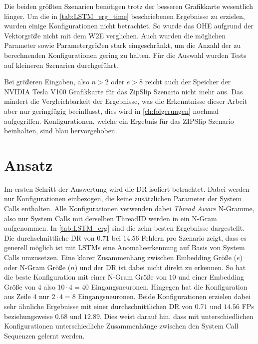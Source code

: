     Die beiden größten Szenarien benötigen trotz der besseren Grafikkarte wesentlich länger.
    Um die in \autoref{tab:LSTM_erg_time} beschriebenen Ergebnisse zu erzielen, wurden einige Konfigurationen nicht betrachtet.
    So wurde das \ac{OHE} aufgrund der Vektorgröße nicht mit dem W2E verglichen.
    Auch wurden die möglichen Parameter sowie Parametergrößen stark eingeschränkt, um die Anzahl der zu berechnenden Konfigurationen gering zu halten.
    Für die Auswahl wurden Tests auf kleineren Szenarien durchgeführt.
    
    Bei größeren Eingaben, also $n>2$ oder $e>8$ reicht auch der Speicher der NVIDIA Tesla V100 Grafikkarte für das ZipSlip Szenario nicht mehr aus.
    Das mindert die Vergleichbarkeit der Ergebnisse, was die Erkenntnisse dieser Arbeit aber nur geringfügig beeinflusst, dies wird in \autoref{ch:folgerungen} nochmal aufgegriffen.
    Konfigurationen, welche ein Ergebnis für das ZIPSlip Szenario beinhalten, sind blau hervorgehoben.

    \section{ Ansatz}\label{sec:erg_LSTM}

    Im ersten Schritt der Auswertung wird die \ac{DR} isoliert betrachtet.
    Dabei werden nur Konfigurationen einbezogen, die keine zusätzlichen Parameter der System Calls enthalten.
    Alle Konfigurationen verwenden dabei \textit{Thread Aware} N-Gramme, also nur System Calls mit derselben ThreadID werden in ein N-Gram aufgenommen.
    In \autoref{tab:LSTM_erg} sind die zehn besten Ergebnisse dargestellt.
    Die durchschnittliche \ac{DR} von $0.71$ bei $14.56$ Fehlern pro Szenario zeigt, dass es generell möglich ist mit \acp{LSTM} eine Anomalieerkennung auf Basis von System Calls umzusetzen.
    Eine klarer Zusammenhang zwischen Embedding Größe ($e$) oder N-Gram Größe ($n$) und der \ac{DR} ist dabei nicht direkt zu erkennen.
    So hat die beste Konfiguration mit einer N-Gram Größe von $10$ und einer Embedding Größe von $4$ also $10 \cdot 4=40$ Eingangsneuronen.
    Hingegen hat die Konfiguration aus Zeile $4$ nur $2 \cdot 4 = 8$ Eingangsneuronen.
    Beide Konfigurationen erzielen dabei sehr ähnliche Ergebnisse mit einer durchschnittlichen \ac{DR} von $0.71$ und $14.56$ \acp{FP} beziehungsweise $0.68$ und $12.89$.
    Dies weist darauf hin, dass mit unterschiedlichen Konfigurationen unterschiedliche Zusammenhänge zwischen den System Call Sequenzen gelernt werden.

